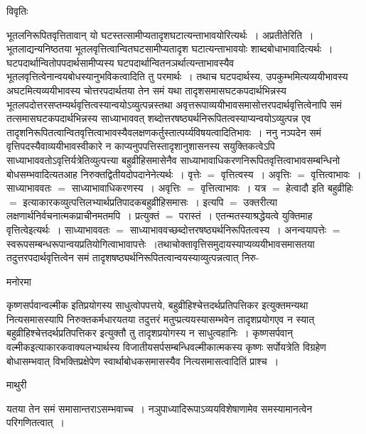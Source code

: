 \documentclass[10pt, openany]{book}
\begin{document}
{ \begin{center}     विवृतिः \end{center}
भूतलनिरूपितवृत्तितावान् यो घटस्तत्सामीप्यतादृशघटात्यन्ताभावयोरित्यर्थः~। {\la अप्रतीतेरिति~।} भूतलाद्यन्यनिष्ठतया भूतलवृत्तित्वान्वितघटसामीप्यतादृश घटात्यन्ताभावयोः शाब्दबोधाभावादित्यर्थः~। घटपदार्थान्वितोपपदार्थसामीप्यस्य घटपदार्थान्वितनञर्थात्यन्ताभावस्यैव भूतलवृत्तित्वेनान्वयबोधस्यानुभविकत्वादिति तु परमार्थः~। तथाच घटपदार्थस्य, उपकुम्भमित्यव्ययीभावस्य अघटमित्यव्ययीभावस्य चोत्तरपदार्थतया तेन समं यथा तादृशसमासघटकपदार्थभिन्नस्य भूतलपदोत्तरसप्तम्यर्थवृत्तित्वस्यान्वयोऽव्युत्पन्नस्तथा अवृत्तरूपाव्ययीभावसमासोत्तरपदार्थवृत्तित्वेनापि समं तत्समासघटकपदार्थभिन्नस्य साध्याभाववत्
शब्दोत्तरषष्ठ्यर्थनिरूपितत्वस्याप्यन्वयोऽव्युत्पन्न एव तादृशनिरूपितत्वान्वितवृत्तित्वाभावस्यैवलक्षणकर्तुस्तात्पर्य्यविषयत्वादितिभावः~। ननु नञ्पदेन समं वृत्तिपदस्यैवाव्ययीभावस्वीकारे न काप्यनुपपत्तिस्तादृशानुशासनस्य सयुक्तिकत्वेऽपि साध्याभाववतोऽवृत्तिर्यत्रेतिव्युत्पत्त्या बहुव्रीहिसमासेनैव
साध्याभावाधिकरणनिरूपितवृत्तित्वाभावसम्बन्धिनो बोधसम्भवादित्यतआह निरुक्तद्वितीयदोपदानेनेत्यर्थः~। वृत्तेः $=$ वृत्तित्वस्य~। अवृत्तिः
 $=$ वृत्तित्वाभावः~। साध्याभाववतः $=$ साध्याभावाधिकरणस्य~। अवृत्तिः $=$ वृत्तित्वाभावः~। यत्र $=$ हेत्वादौ इति बहुव्रीहिः $=$ इत्याकारकव्युत्पत्तिलभ्यार्थप्रतिपादकबहुव्रीहिसमासः~।
इत्यपि $=$ उक्तरीत्या लक्षणार्थनिर्वचनात्मकप्राचीनमतमपि~। प्रत्युक्तं $=$ परास्तं~। एतन्मतस्याश्रद्धेयत्वे युक्तिमाह वृत्तित्वेइत्यर्थः~।
साध्याभाववतः $=$ साध्याभाववच्छब्दोत्तरषष्ठ्यर्थनिरूपितत्वस्य~। अनन्वयापत्तेः $=$ स्वरूपसम्बन्धरूपान्वयप्रतियोगित्वाभावापत्तेः~।तथाचोक्तावृत्तिसमुदायस्याप्यव्ययीभावसमासतया तदुत्तरपदार्थवृत्तित्वेन समं तादृशषष्ठ्यर्थनिरूपितत्वान्वयस्याव्युत्पन्नत्वात् निरु-
 \begin{center}   मनोरमा  \end{center} 
कृष्णसर्पवान्वल्मीक इतिप्रयोगस्य साधुत्वोपपत्तये, बहुव्रीहिश्चेत्तदर्थप्रतिपत्तिकर इत्युक्तमन्यथा नित्यसमासस्यापि निरुक्तकर्मधारयतया तदुत्तरं मतुप्प्रत्ययस्यासम्भवेन तादृशप्रयोगएव न स्यात् बहुव्रीहिश्चेत्तदर्थप्रतिपत्तिकर इत्युक्तौ तु तादृशप्रयोगस्य न साधुत्वहानिः~। कृष्णसर्पवान् वल्मीकइत्याकारकवाक्यलभ्यार्थस्य विजातीयसर्पसम्बन्धिवल्मीकात्मकस्य कृष्णः सर्पोयत्रेति विग्रहेण बोधासम्भवात् विभक्तिप्रक्षेपेण स्वार्थाबोधकसमासस्यैव नित्यसमासत्वादितिं प्राश्च~।
\newpage
\begin{center}  माथुरी  \end{center}
{\la यतया तेन समं समासान्तराऽसम्भवाच्च~। नञुपाध्यादिरूपाऽव्ययविशेषाणामेव समस्यामानत्वेन परिगणितत्वात्~।}\\

}
\end{document}
